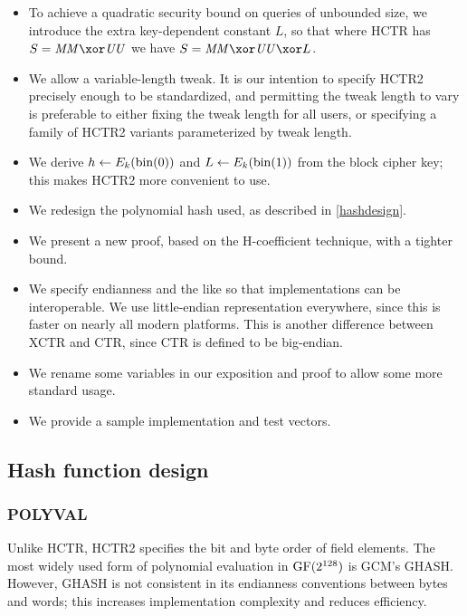 \documentclass[hctr.tex]{subfiles}
\begin{document}
\begin{itemize}
    \item To achieve a quadratic security bound
    on queries of unbounded size,
    we introduce the extra
    key-dependent constant \(L\),
    so that where HCTR has \(S = \MM \xor \UU\)
    we have \(S = \MM \xor \UU \xor L\).
    \item We allow a variable-length tweak. It is our intention to specify
    HCTR2 precisely enough to be standardized, and permitting the tweak length
    to vary is preferable to either fixing the tweak length for all users,
    or specifying a family of HCTR2 variants parameterized by tweak length.
    \item We derive \(h \gets E_k(\operatorname{bin}(0))\)
    and \(L \gets E_k(\operatorname{bin}(1))\) from the block cipher key;
    this makes HCTR2 more convenient to use.
    \item We redesign the polynomial hash used, as described in
    \autoref{hashdesign}.
    \item We present a new proof, based on the H-coefficient technique,
    with a tighter bound.
    \item We specify endianness and the like so that implementations can be interoperable. We use little-endian representation everywhere,
    since this is faster on nearly all modern platforms.
    This is another difference between XCTR and CTR, since
    CTR is defined to be big-endian.
    \item We rename some variables in our exposition and proof to allow some more standard usage.
    \item We provide a sample implementation and test vectors.
\end{itemize}

\subsection{Hash function design}\label{hashdesign}

\subsubsection{POLYVAL}

Unlike HCTR, HCTR2 specifies the bit and byte order of field elements.
The most widely used form of polynomial evaluation
in \(\operatorname{GF}(2^{128})\) is GCM's GHASH\cite{gcm}.
However, GHASH is not consistent in its endianness conventions
between bytes and words;
this increases implementation complexity and reduces efficiency.
\end{document}
